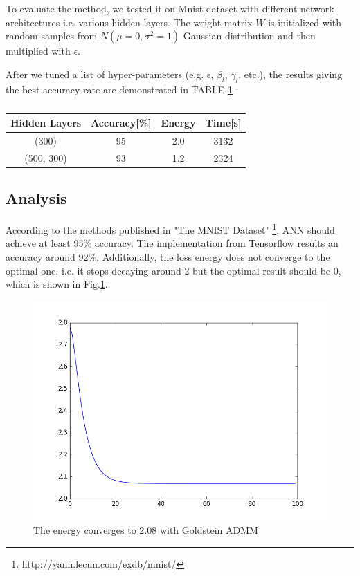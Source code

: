 \documentclass[letterpaper, 10 pt, conference]{ieeeconf}  %
\begin{document}
To evaluate the method, we tested it on Mnist dataset with different network architectures i.e. various hidden layers. The weight matrix $W$ is initialized with random samples from $N(\mu=0, \sigma^2=1)$ Gaussian distribution and then multiplied with $\epsilon$. 

After we tuned a list of hyper-parameters (e.g. $\epsilon$, $\beta_l$, $\gamma_l$, etc.), the results giving the best accuracy rate are demonstrated in TABLE \ref{tab:res1}
:
\begin{table}[h]
\centering
\caption{}
\begin{tabular}{|c|c|c|c|}
\hline
		Hidden Layers & Accuracy[\%] & Energy &Time[s]\\
\hline
		(300) & 95 & 2.0 & 3132\\
		(500, 300) & 93 & 1.2 & 2324 \\
\hline
\end{tabular}
\label{tab:res1}
\end{table}

\subsection{Analysis}
According to the methods published in "The MNIST Dataset" \footnote{http://yann.lecun.com/exdb/mnist/}, ANN should achieve at least 95\% accuracy. The implementation from Tensorflow results an accuracy around 92\%. Additionally, the loss energy does not converge to the optimal one, i.e. it stops decaying around 2 but the optimal result should be 0, which is shown in Fig.\ref{fig:energySame}.

\begin{figure}
\centering
\includegraphics[width=\columnwidth]{figure/energy_has_lambda.png}
\caption{The energy converges to 2.08 with Goldstein ADMM}
\label{fig:energySame}
\end{figure}
\end{document}
